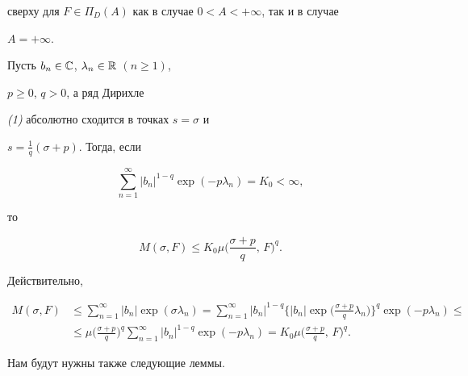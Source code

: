 сверху для $F\in\Pi_D(A)$ как в случае $0<A<+\infty$, так и в случае 


$A=+\infty$. 


 


\begin{lem} Пусть $b_n\in\Bbb C$, $\lambda_n\in\Bbb R$ $(n\ge 1)$, 


$p\ge 0$, $q>0$, а ряд Дирихле 


{\em (1)} абсолютно сходится в точках $s=\sigma$ и 


$s=\frac{1}{q}(\sigma+p)$. Тогда, если 


\begin{equation} 


\sum^\infty_{n=1}|b_n|^{1-q}\exp(-p\lambda_n)=K_0<\infty, 


\end{equation} 


то 


\begin{equation} 


M(\sigma,F)\le K_0\mu 


\biggl(\frac{\sigma+p}{q},\,F \biggr)^q. 


\end{equation} 


\end{lem} 


 


Действительно, 


\begin{align*} 


M(\sigma,F)&\le\sum^\infty_{n=1}|b_n|\exp(\sigma\lambda_n)= 


\sum^\infty_{n=1}|b_n|^{1-q}\biggl\{|b_n|\exp\biggr( 


\frac{\sigma+p}{q}\lambda_n\biggr)\biggr\}^q\exp(-p\lambda_n)\le \\ 


&\le\mu\biggl(\frac{\sigma+p}{q}\biggr)^q\sum^\infty_{n=1} 


|b_n|^{1-q}\exp(-p\lambda_n)=K_0\mu 


\biggl(\frac{\sigma+p}{q},\,F \biggr)^q.


\end{align*} 


 


Нам будут нужны также следующие леммы. 


 


